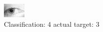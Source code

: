 \begin{figure}[h!]
\begin{center}
\includegraphics[width=0.60\columnwidth]{figures/ID1385_class_4_target_3.png}
\end{center}
\caption{ Classification: 4 actual target: 3}
\label{fig:ID1385_class_4_target_3}
\end{figure}
